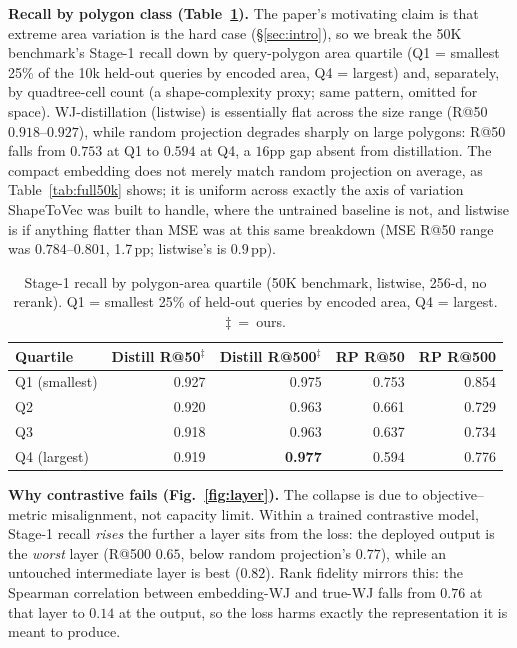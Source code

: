 \documentclass[sigconf]{acmart}
\begin{document}
\textbf{Recall by polygon class (Table~\ref{tab:bucket}).} The paper's motivating
claim is that extreme area variation is the hard case (\S\ref{sec:intro}), so we
break the 50K benchmark's Stage-1 recall down by query-polygon area quartile (Q1 =
smallest 25\% of the 10k held-out queries by encoded area, Q4 = largest) and,
separately, by quadtree-cell count (a shape-complexity proxy; same pattern, omitted
for space). WJ-distillation (listwise) is essentially flat across the size range
(R@50 $0.918$--$0.927$), while random projection degrades sharply on large
polygons: R@50 falls from $0.753$ at Q1 to $0.594$ at Q4, a $16$pp gap absent from
distillation. The compact embedding does not merely match random projection on
average, as Table~\ref{tab:full50k} shows; it is uniform across exactly the axis of
variation ShapeToVec was built to handle, where the untrained baseline is not, and
listwise is if anything flatter than MSE was at this same breakdown (MSE R@50 range
was $0.784$--$0.801$, 1.7\,pp; listwise's is $0.9$\,pp).

\begin{table}[t]\centering
\caption{Stage-1 recall by polygon-area quartile (50K benchmark, listwise, 256-d,
no rerank). Q1 = smallest 25\% of held-out queries by encoded area, Q4 = largest.
$\ddagger$~=~ours.}
\label{tab:bucket}\setlength{\tabcolsep}{3pt}\footnotesize
\begin{tabular}{@{}lrrrr@{}}
\toprule
Quartile & Distill R@50$^\ddagger$ & Distill R@500$^\ddagger$ & RP R@50 & RP R@500 \\
\midrule
Q1 (smallest) & 0.927 & 0.975 & 0.753 & 0.854 \\
Q2             & 0.920 & 0.963 & 0.661 & 0.729 \\
Q3             & 0.918 & 0.963 & 0.637 & 0.734 \\
Q4 (largest)   & 0.919 & \textbf{0.977} & 0.594 & 0.776 \\
\bottomrule
\end{tabular}
\end{table}

\textbf{Why contrastive fails (Fig.~\ref{fig:layer}).}
The collapse is due to objective--metric misalignment, not capacity limit. Within a
trained contrastive model, Stage-1 recall \emph{rises} the further a layer sits from
the loss: the deployed output is the \emph{worst} layer (R@500 $0.65$, below random
projection's $0.77$), while an untouched intermediate layer is best ($0.82$). Rank
fidelity mirrors this: the Spearman correlation between embedding-WJ and true-WJ
falls from $0.76$ at that layer to $0.14$ at the output, so the loss harms exactly
the representation it is meant to produce.
\end{document}
